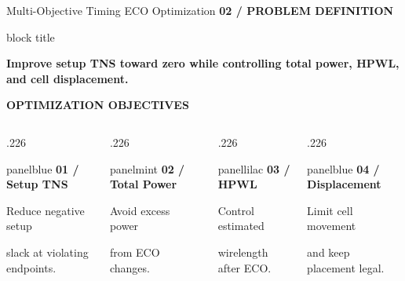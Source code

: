 \documentclass[aspectratio=169,10pt]{beamer}
\newcommand{\smalllabel}[1]{{\scriptsize\bfseries\color{Accent}\MakeUppercase{#1}}}
\newcommand{\takeaway}[1]{%
  \begin{beamercolorbox}[rounded=true,sep=0.15cm,wd=\linewidth]{block title}%
    \strut\textbf{#1}\strut
  \end{beamercolorbox}%
}
\begin{document}
\begin{frame}{Multi-Objective Timing ECO Optimization}
  \vspace{.01cm}
  \smalllabel{02 / Problem Definition}\par\vspace{.10cm}
  \takeaway{Improve setup TNS toward zero while controlling total power, HPWL, and cell displacement.}
  \vspace{.14cm}

  \smalllabel{Optimization Objectives}\par\vspace{.08cm}
  \begin{columns}[T,onlytextwidth]
    \begin{column}{.226\textwidth}
      \begin{beamercolorbox}[rounded=true,sep=.14cm,wd=\linewidth]{panelblue}
        {\small\bfseries\color{AccentBlue}01 / Setup TNS}\par\vspace{.11cm}
        {\scriptsize Reduce negative setup\par slack at violating endpoints.}
      \end{beamercolorbox}
    \end{column}
    \begin{column}{.226\textwidth}
      \begin{beamercolorbox}[rounded=true,sep=.14cm,wd=\linewidth]{panelmint}
        {\small\bfseries\color{Accent}02 / Total Power}\par\vspace{.11cm}
        {\scriptsize Avoid excess power\par from ECO changes.}
      \end{beamercolorbox}
    \end{column}
    \begin{column}{.226\textwidth}
      \begin{beamercolorbox}[rounded=true,sep=.14cm,wd=\linewidth]{panellilac}
        {\small\bfseries\color{AccentBlue}03 / HPWL}\par\vspace{.11cm}
        {\scriptsize Control estimated\par wirelength after ECO.}
      \end{beamercolorbox}
    \end{column}
    \begin{column}{.226\textwidth}
      \begin{beamercolorbox}[rounded=true,sep=.14cm,wd=\linewidth]{panelblue}
        {\small\bfseries\color{Accent}04 / Displacement}\par\vspace{.11cm}
        {\scriptsize Limit cell movement\par and keep placement legal.}
      \end{beamercolorbox}
    \end{column}
  \end{columns}


\end{frame}
\end{document}
